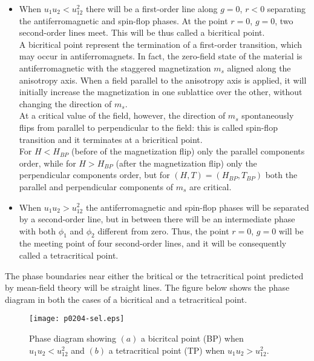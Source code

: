 \documentclass[a4paper,11pt, notitlepage]{report}
\begin{document}
\begin{itemize}
\item When $u_1u_2 < u_{12}^2$ there will be a first-order line along $g=0$, $r<0$ separating the antiferromagnetic and spin-flop phases. At the point $r=0$, $g=0$, two second-order lines meet. This will be thus called a bicritical point. \\
A bicritical point represent the termination of a first-order transition, which may occur in antiferromagnets. In fact, the zero-field state of the material is antiferromagnetic with the staggered magnetization $m_s$ aligned along the anisotropy axis. When a field parallel to the anisotropy axis is applied, it will initially increase the magnetization in one sublattice over the other, without changing the direction of $m_s$. \\
At a critical value of the field, however, the direction of $m_s$ spontaneously flips from parallel to perpendicular to the field: this is called spin-flop transition and it terminates at a bricritical point. \\
For $H<H_{BP}$ (before of the magnetization flip) only the parallel components order, while for $H>H_{BP}$ (after the magnetization flip) only the perpendicular components order, but for $(H, T) = (H_{BP}, T_{BP})$ both the parallel and perpendicular components of $m_s$ are critical. 
\item When $u_1u_2 > u_{12}^2$ the antiferromagnetic and spin-flop phases will be separated by a second-order line, but in between there will be an intermediate phase with both $\phi_1$ and $\phi_2$ different from zero. Thus, the point $r=0$, $g=0$ will be the meeting point of four second-order lines, and it will be consequently called a tetracritical point. 
\end{itemize}
The phase boundaries near either the britical or the tetracritical point predicted by mean-field theory will be straight lines. The figure below shows the phase diagram in both the cases of a bicritical and a tetracritical point. 

\begin{figure}
\begin{center}
\texttt{[image: p0204-sel.eps]}
\end{center}
\caption{Phase diagram showing $(a)$ a bicritcal point (BP) when $u_1u_2 < u_{12}^2$ and $(b)$ a tetracritical point (TP) when $u_1u_2 > u_{12}^2$.}
\label{fig:dessin}
\end{figure}
\end{document}
